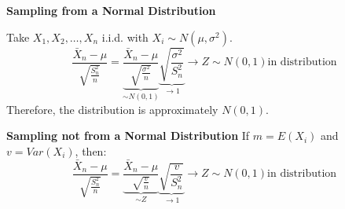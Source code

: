 \textbf{Sampling from a Normal Distribution}

Take $X_1, X_2, \ldots , X_n$ i.i.d. with $X_i \sim N(\mu, \sigma^2)$.
\[
\frac{\bar{X}_n - \mu}{\sqrt{\frac{S_n^2}{n}}} = \underbrace{\frac{\bar{X}_n - \mu}{\sqrt{\frac{\sigma^2}{n}}}}_{\sim N(0,1)} \underbrace{\sqrt{\frac{\sigma^2}{S_n^2}}}_{\to 1} \to Z \sim N(0,1) \text{in distribution}
\]
Therefore, the distribution is approximately $N(0,1)$.

\textbf{Sampling not from a Normal Distribution}
If $m = E(X_i)$ and $v = Var(X_i)$, then:
\[
\frac{\bar{X}_n - \mu}{\sqrt{\frac{S_n^2}{n}}} = \underbrace{\frac{\bar{X}_n - \mu}{\sqrt{\frac{v}{n}}}}_{\sim Z} \underbrace{\sqrt{\frac{v}{S_n^2}}}_{\to 1} \to Z \sim N(0,1) \text{in distribution}
\]

